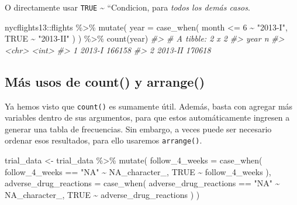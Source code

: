 \documentclass[
]{book}
\newenvironment{Shaded}{\begin{snugshade}}{\end{snugshade}}
\newcommand{\AttributeTok}[1]{\textcolor[rgb]{0.77,0.63,0.00}{#1}}
\newcommand{\CommentTok}[1]{\textcolor[rgb]{0.56,0.35,0.01}{\textit{#1}}}
\newcommand{\ConstantTok}[1]{\textcolor[rgb]{0.00,0.00,0.00}{#1}}
\newcommand{\DecValTok}[1]{\textcolor[rgb]{0.00,0.00,0.81}{#1}}
\newcommand{\FunctionTok}[1]{\textcolor[rgb]{0.00,0.00,0.00}{#1}}
\newcommand{\NormalTok}[1]{#1}
\newcommand{\OtherTok}[1]{\textcolor[rgb]{0.56,0.35,0.01}{#1}}
\newcommand{\SpecialCharTok}[1]{\textcolor[rgb]{0.00,0.00,0.00}{#1}}
\newcommand{\StringTok}[1]{\textcolor[rgb]{0.31,0.60,0.02}{#1}}
\begin{document}
O directamente usar \texttt{TRUE} \textasciitilde{} ``Condicion, para \emph{todos los demás casos}.

\begin{Shaded}
\begin{Highlighting}[]
\NormalTok{nycflights13}\SpecialCharTok{::}\NormalTok{flights }\SpecialCharTok{\%\textgreater{}\%} 
  \FunctionTok{mutate}\NormalTok{(}
    \AttributeTok{year =} \FunctionTok{case\_when}\NormalTok{(}
\NormalTok{      month }\SpecialCharTok{\textless{}=} \DecValTok{6} \SpecialCharTok{\textasciitilde{}} \StringTok{"2013{-}I"}\NormalTok{,}
      \ConstantTok{TRUE} \SpecialCharTok{\textasciitilde{}} \StringTok{"2013{-}II"}
\NormalTok{    )}
\NormalTok{  ) }\SpecialCharTok{\%\textgreater{}\%} 
  \FunctionTok{count}\NormalTok{(year)}
\CommentTok{\#\textgreater{} \# A tibble: 2 x 2}
\CommentTok{\#\textgreater{}   year         n}
\CommentTok{\#\textgreater{}   \textless{}chr\textgreater{}    \textless{}int\textgreater{}}
\CommentTok{\#\textgreater{} 1 2013{-}I  166158}
\CommentTok{\#\textgreater{} 2 2013{-}II 170618}
\end{Highlighting}
\end{Shaded}

\hypertarget{muxe1s-usos-de-count-y-arrange}{%
\subsection{Más usos de count() y arrange()}\label{muxe1s-usos-de-count-y-arrange}}

Ya hemos visto que \texttt{count()} es sumamente útil. Además, basta con agregar más variables dentro de sus argumentos, para que estos automáticamente ingresen a generar una tabla de frecuencias. Sin embargo, a veces puede ser necesario ordenar esos resultados, para ello usaremos \texttt{arrange()}.

\begin{Shaded}
\begin{Highlighting}[]
\NormalTok{trial\_data }\OtherTok{\textless{}{-}}\NormalTok{ trial\_data }\SpecialCharTok{\%\textgreater{}\%} 
  \FunctionTok{mutate}\NormalTok{(}
    \AttributeTok{follow\_4\_weeks =} \FunctionTok{case\_when}\NormalTok{(}
\NormalTok{      follow\_4\_weeks }\SpecialCharTok{==} \StringTok{"NA"} \SpecialCharTok{\textasciitilde{}} \ConstantTok{NA\_character\_}\NormalTok{,}
      \ConstantTok{TRUE} \SpecialCharTok{\textasciitilde{}}\NormalTok{ follow\_4\_weeks}
\NormalTok{    ),}
    \AttributeTok{adverse\_drug\_reactions =} \FunctionTok{case\_when}\NormalTok{(}
\NormalTok{      adverse\_drug\_reactions }\SpecialCharTok{==} \StringTok{"NA"} \SpecialCharTok{\textasciitilde{}} \ConstantTok{NA\_character\_}\NormalTok{,}
      \ConstantTok{TRUE} \SpecialCharTok{\textasciitilde{}}\NormalTok{ adverse\_drug\_reactions}
\NormalTok{    )}
\NormalTok{  )}
\end{Highlighting}
\end{Shaded}
\end{document}
